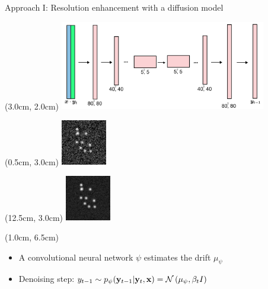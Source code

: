 \documentclass{beamer}					%
\begin{document}
\begin{frame}{Approach I: Resolution enhancement with a diffusion model}
\begin{textblock*}{9cm}(3.0cm, 2.0cm)
\includegraphics[width=9cm]{../../ddpm/ddpm/media/DiffusionArch.png}
\end{textblock*}
\begin{textblock*}{2cm}(0.5cm, 3.0cm)
\includegraphics[width=2cm]{../../dissertation/dissertation/media/diffusion_example/0_1_sr_79.png}
\end{textblock*}
\begin{textblock*}{2cm}(12.5cm, 3.0cm)
\includegraphics[width=2cm]{../../dissertation/dissertation/media/diffusion_example/0_1_sr_99.png}
\end{textblock*}

\begin{textblock*}{13cm}(1.0cm, 6.5cm)
\begin{itemize}
\item A convolutional neural network $\psi$ estimates the drift $\mu_{\psi}$
\item Denoising step: $y_{t-1}\sim p_{\psi}(\bold{y}_{t-1}|\bold{y}_{t},\bold{x}) = \mathcal{N}\left(\mu_{\psi},\beta_{t}I\right)$
\end{itemize}
\end{textblock*}
\end{frame}
\end{document}
